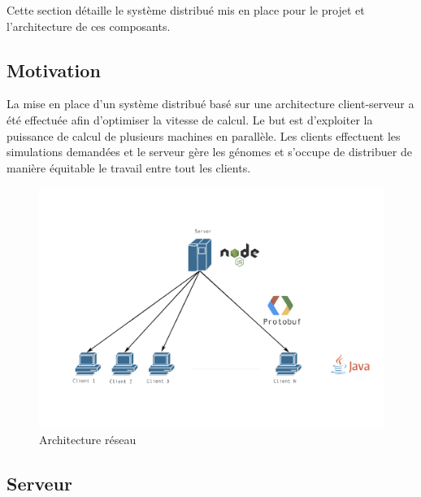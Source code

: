 \documentclass{article}
\begin{document}
Cette section détaille le système distribué mis en place pour le projet et l'architecture de ces composants.

\subsection{Motivation}

La mise en place d'un système distribué basé sur une architecture client-serveur a été effectuée afin d'optimiser la vitesse de calcul. Le but est d'exploiter la puissance de calcul de plusieurs machines en parallèle. Les clients effectuent les simulations demandées et le serveur gère les génomes et s'occupe de distribuer de manière équitable le travail entre tout les clients.\\

\begin{figure}[H]
\begin{center}
	\includegraphics[scale=0.5]{archnet.png}
	\caption{Architecture réseau}
\end{center}
\end{figure}

\subsection{Serveur}
\end{document}
